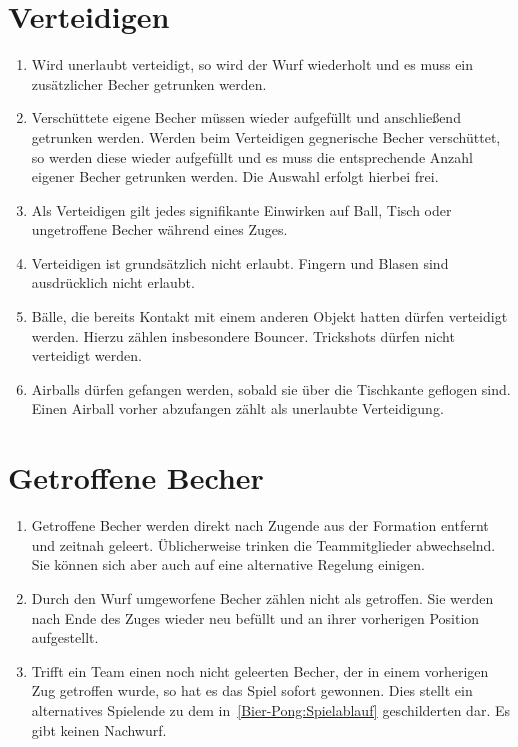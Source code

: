 \section{Verteidigen}\label{Bier-Pong:Verteidigen}
\begin{enumerate}[label={(\arabic*)}]
    \item
    Wird unerlaubt verteidigt, so wird der Wurf wiederholt und es muss ein zusätzlicher Becher getrunken werden.

    \item
    Verschüttete eigene Becher müssen wieder aufgefüllt und anschließend getrunken werden.
    Werden beim Verteidigen gegnerische Becher verschüttet, so werden diese wieder aufgefüllt und es muss die entsprechende Anzahl eigener Becher getrunken werden.
    Die Auswahl erfolgt hierbei frei.

    \item
    Als Verteidigen gilt jedes signifikante Einwirken auf Ball, Tisch oder ungetroffene Becher während eines Zuges.

    \item
    Verteidigen ist grundsätzlich nicht erlaubt.
    Fingern und Blasen sind ausdrücklich nicht erlaubt.

    \item
    Bälle, die bereits Kontakt mit einem anderen Objekt hatten dürfen verteidigt werden.
    Hierzu zählen insbesondere Bouncer.
    Trickshots dürfen nicht verteidigt werden.

    \item
    Airballs dürfen gefangen werden, sobald sie über die Tischkante geflogen sind.
    Einen Airball vorher abzufangen zählt als unerlaubte Verteidigung.
\end{enumerate}

\section{Getroffene Becher}
\begin{enumerate}[label={(\arabic*)}]
    \item
    Getroffene Becher werden direkt nach Zugende aus der Formation entfernt und zeitnah geleert.
    Üblicherweise trinken die Teammitglieder abwechselnd.
    Sie können sich aber auch auf eine alternative Regelung einigen.

    \item
    Durch den Wurf umgeworfene Becher zählen nicht als getroffen.
    Sie werden nach Ende des Zuges wieder neu befüllt und an ihrer vorherigen Position aufgestellt.

    \item
    Trifft ein Team einen noch nicht geleerten Becher, der in einem vorherigen Zug getroffen wurde, so hat es das Spiel sofort gewonnen.
    Dies stellt ein alternatives Spielende zu dem in~\ref{Bier-Pong:Spielablauf} geschilderten dar.
    Es gibt keinen Nachwurf.
\end{enumerate}

